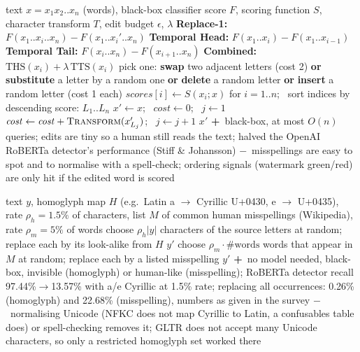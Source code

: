 \documentclass[10pt,a4paper,twocolumn]{article}
\newcommand{\pro}[1]{\Statex\textcolor{proc}{\textbf{+}\ #1}}
\newcommand{\con}[1]{\Statex\textcolor{conc}{\textbf{$-$}\ #1}}
\begin{document}
\begin{algorithm}[H]\small
\caption{DeepWordBug (Gao et al.\ 2018; used on text detectors by Stiff \& Johansson 2022)}
\begin{algorithmic}[1]
\Require text $x=x_1x_2..x_n$ (words), black-box classifier score $F$, scoring function $S$, character transform $T$, edit budget $\epsilon$, $\lambda$
 
 \State \textbf{Replace-1:} $F(x_1..x_i..x_n)-F(x_1..x_i'..x_n)$ 
 \State \textbf{Temporal Head:} $F(x_1..x_i)-F(x_1..x_{i-1})$
 \State \textbf{Temporal Tail:} $F(x_i..x_n)-F(x_{i+1}..x_n)$
 \State \textbf{Combined:} $\mathrm{THS}(x_i)+\lambda\,\mathrm{TTS}(x_i)$
\EndFunction
{} 
 \State pick one: \textbf{swap} two adjacent letters (cost 2) \textbf{or} \textbf{substitute} a letter by a random one \textbf{or} \textbf{delete} a random letter \textbf{or} \textbf{insert} a random letter (cost 1 each)
\EndFunction
{}
 \State $\mathit{scores}[i]\gets S(x_i;x)$ for $i=1..n$; \ sort indices by descending score: $L_1..L_n$
 \State $x'\gets x$; \ $\mathit{cost}\gets0$; \ $j\gets1$
  \State $\mathit{cost}\gets\mathit{cost}+\textsc{Transform}(x'_{L_j})$; \ $j\gets j+1$ 
 \EndWhile
 \State \Return $x'$
\EndProcedure
\pro{black-box, at most $O(n)$ queries; edits are tiny so a human still reads the text; halved the OpenAI RoBERTa detector's performance (Stiff \& Johansson)}
\con{misspellings are easy to spot and to normalise with a spell-check; ordering signals (watermark green/red) are only hit if the edited word is scored}
\end{algorithmic}
\end{algorithm}

\begin{algorithm}[H]\small
\caption{Homoglyph and misspelling attacks (Wolff 2020)}
\begin{algorithmic}[1]
\Require text $y$, homoglyph map $H$ (e.g.\ Latin a $\to$ Cyrillic U+0430, e $\to$ U+0435), rate $\rho_h=1.5\%$ of characters, list $M$ of common human misspellings (Wikipedia), rate $\rho_m=5\%$ of words
 \State choose $\rho_h|y|$ characters of the source letters at random; replace each by its look-alike from $H$
 \State \Return $y'$ 
\EndProcedure
{}
 \State choose $\rho_m\cdot\#\text{words}$ words that appear in $M$ at random; replace each by a listed misspelling
 \State \Return $y'$
\EndProcedure
\pro{no model needed, black-box, invisible (homoglyph) or human-like (misspelling); RoBERTa detector recall 97.44\%$\to$13.57\% with a/e Cyrillic at 1.5\% rate; replacing all occurrences: 0.26\% (homoglyph) and 22.68\% (misspelling), numbers as given in the survey}
\con{normalising Unicode (NFKC does not map Cyrillic to Latin, a confusables table does) or spell-checking removes it; GLTR does not accept many Unicode characters, so only a restricted homoglyph set worked there}
\end{algorithmic}
\end{algorithm}
\end{document}
